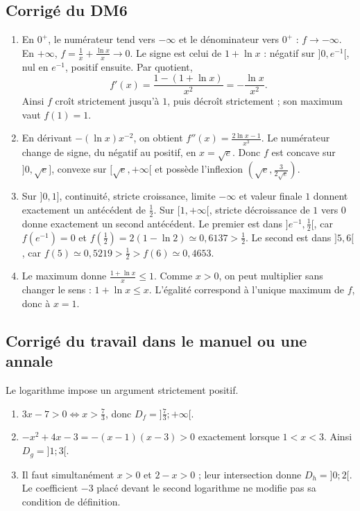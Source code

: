 \subsection{Corrigé du DM6}\begin{enumerate}
\item En $0^+$, le numérateur tend vers $-\infty$ et le dénominateur vers $0^+$ : $f\to-\infty$. En $+\infty$, $f=\frac{1}{x}+\frac{\ln x}{x}\to0$. Le signe est celui de $1+\ln x$ : négatif sur $]0,e^{-1}[$, nul en $e^{-1}$, positif ensuite. Par quotient,
\[f'(x)=\frac{1-(1+\ln x)}{x^2}=-\frac{\ln x}{x^2}.\]
Ainsi $f$ croît strictement jusqu'à $1$, puis décroît strictement ; son maximum vaut $f(1)=1$.
\item En dérivant $-(\ln x)x^{-2}$, on obtient $f''(x)=\frac{2\ln x-1}{x^3}$. Le numérateur change de signe, du négatif au positif, en $x=\sqrt e$. Donc $f$ est concave sur $]0,\sqrt e]$, convexe sur $[\sqrt e,+\infty[$ et possède l'inflexion $(\sqrt{e},\frac{3}{2\sqrt e})$.
\item Sur $]0,1]$, continuité, stricte croissance, limite $-\infty$ et valeur finale $1$ donnent exactement un antécédent de $\frac{1}{2}$. Sur $[1,+\infty[$, stricte décroissance de $1$ vers $0$ donne exactement un second antécédent. Le premier est dans $]e^{-1},\frac{1}{2}[$, car $f(e^{-1})=0$ et $f(\frac{1}{2})=2(1-\ln2)\simeq0{,}6137>\frac{1}{2}$. Le second est dans $]5,6[$, car $f(5)\simeq0{,}5219>\frac{1}{2}>f(6)\simeq0{,}4653$.
\item Le maximum donne $\frac{1+\ln x}{x}\le1$. Comme $x>0$, on peut multiplier sans changer le sens : $1+\ln x\le x$. L'égalité correspond à l'unique maximum de $f$, donc à $x=1$.
\end{enumerate}

\subsection{Corrigé du travail dans le manuel ou une annale}Le logarithme impose un argument strictement positif.
\begin{enumerate}
\item $3x-7>0\Longleftrightarrow x>\frac73$, donc $D_f=]\frac73;+\infty[$.
\item $-x^2+4x-3=-(x-1)(x-3)>0$ exactement lorsque $1<x<3$. Ainsi $D_g=]1;3[$.
\item Il faut simultanément $x>0$ et $2-x>0$ ; leur intersection donne $D_h=]0;2[$. Le coefficient $-3$ placé devant le second logarithme ne modifie pas sa condition de définition.
\end{enumerate}

\fi

